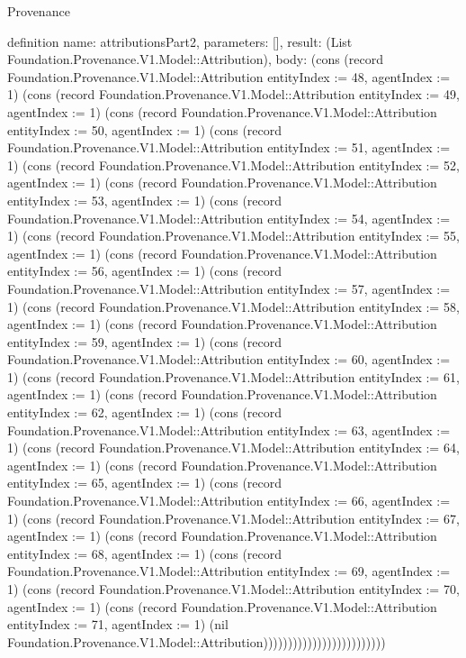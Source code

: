 \begin{lexlean}{Provenance}
\begin{semanticmodule}
definition{
  name: attributionsPart2,
  parameters: [],
  result: (List Foundation.Provenance.V1.Model::Attribution),
  body: (cons (record Foundation.Provenance.V1.Model::Attribution {entityIndex := 48, agentIndex := 1}) (cons (record Foundation.Provenance.V1.Model::Attribution {entityIndex := 49, agentIndex := 1}) (cons (record Foundation.Provenance.V1.Model::Attribution {entityIndex := 50, agentIndex := 1}) (cons (record Foundation.Provenance.V1.Model::Attribution {entityIndex := 51, agentIndex := 1}) (cons (record Foundation.Provenance.V1.Model::Attribution {entityIndex := 52, agentIndex := 1}) (cons (record Foundation.Provenance.V1.Model::Attribution {entityIndex := 53, agentIndex := 1}) (cons (record Foundation.Provenance.V1.Model::Attribution {entityIndex := 54, agentIndex := 1}) (cons (record Foundation.Provenance.V1.Model::Attribution {entityIndex := 55, agentIndex := 1}) (cons (record Foundation.Provenance.V1.Model::Attribution {entityIndex := 56, agentIndex := 1}) (cons (record Foundation.Provenance.V1.Model::Attribution {entityIndex := 57, agentIndex := 1}) (cons (record Foundation.Provenance.V1.Model::Attribution {entityIndex := 58, agentIndex := 1}) (cons (record Foundation.Provenance.V1.Model::Attribution {entityIndex := 59, agentIndex := 1}) (cons (record Foundation.Provenance.V1.Model::Attribution {entityIndex := 60, agentIndex := 1}) (cons (record Foundation.Provenance.V1.Model::Attribution {entityIndex := 61, agentIndex := 1}) (cons (record Foundation.Provenance.V1.Model::Attribution {entityIndex := 62, agentIndex := 1}) (cons (record Foundation.Provenance.V1.Model::Attribution {entityIndex := 63, agentIndex := 1}) (cons (record Foundation.Provenance.V1.Model::Attribution {entityIndex := 64, agentIndex := 1}) (cons (record Foundation.Provenance.V1.Model::Attribution {entityIndex := 65, agentIndex := 1}) (cons (record Foundation.Provenance.V1.Model::Attribution {entityIndex := 66, agentIndex := 1}) (cons (record Foundation.Provenance.V1.Model::Attribution {entityIndex := 67, agentIndex := 1}) (cons (record Foundation.Provenance.V1.Model::Attribution {entityIndex := 68, agentIndex := 1}) (cons (record Foundation.Provenance.V1.Model::Attribution {entityIndex := 69, agentIndex := 1}) (cons (record Foundation.Provenance.V1.Model::Attribution {entityIndex := 70, agentIndex := 1}) (cons (record Foundation.Provenance.V1.Model::Attribution {entityIndex := 71, agentIndex := 1}) (nil Foundation.Provenance.V1.Model::Attribution)))))))))))))))))))))))))
}


\end{semanticmodule}
\end{lexlean}
